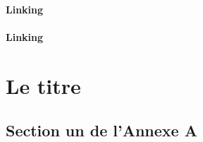\documentclass[12pt,twoside,maitrise]{dms}
\theoremstyle{definition}
\begin{document}
\subsubsection{Linking}

\subsubsection{Linking}





\def\bibname{References}


\appendix
\chapter{Le titre}

\section{Section un de l'Annexe A}
\end{document}
